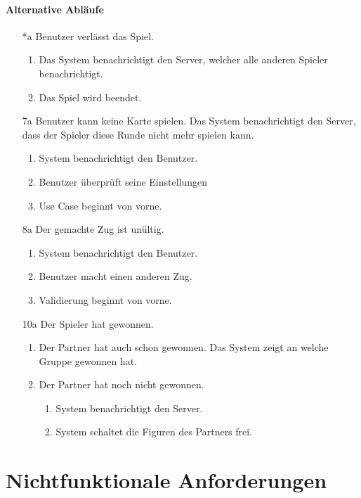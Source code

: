 \documentclass[a4paper,12pt,halfparskip,DIV14]{scrartcl}
\begin{document}
\paragraph{Alternative Abläufe}
\begin{enumerate}
	\item[*a] Benutzer verlässt das Spiel.
	\begin{enumerate}
		\item Das System benachrichtigt den Server, welcher alle anderen Spieler benachrichtigt.
		\item Das Spiel wird beendet.
	\end{enumerate}
	\item[7a] Benutzer kann keine Karte spielen.\newline
	Das System benachrichtigt den Server, dass der Spieler diese Runde nicht mehr spielen kann.
	\begin{enumerate}
		\item System benachrichtigt den Benutzer.
		\item Benutzer überprüft seine Einstellungen
		\item Use Case beginnt von vorne.
	\end{enumerate}
	\item[8a] Der gemachte Zug ist unültig.
	\begin{enumerate}
		\item System benachrichtigt den Benutzer.
		\item Benutzer macht einen anderen Zug.
		\item Validierung beginnt von vorne.
	\end{enumerate}
	\item[10a] Der Spieler hat gewonnen.
	\begin{enumerate}
		\item Der Partner hat auch schon gewonnen.\newline
		Das System zeigt an welche Gruppe gewonnen hat.
		\item Der Partner hat noch nicht gewonnen.
		\begin{enumerate}
			\item System benachrichtigt den Server.
			\item System schaltet die Figuren des Partners frei.
		\end{enumerate}
	\end{enumerate}
\end{enumerate}

\section{Nichtfunktionale Anforderungen}\label{cha:nichtfunktionale_anforderungen} %
\end{document}
